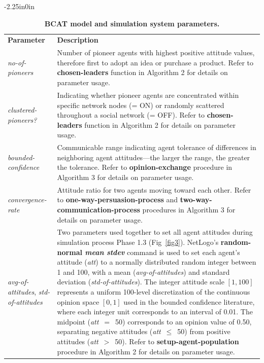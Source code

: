 \documentclass[10pt,letterpaper]{article}
\newlength\savedwidth
\newcommand\thickhline{\noalign{\global\savedwidth\arrayrulewidth\global\arrayrulewidth 2pt}%
\hline
\noalign{\global\arrayrulewidth\savedwidth}}
\begin{document}
\begin{table}[!ht]
\begin{adjustwidth}{-2.25in}{0in}
\centering
\caption{\textbf{BCAT model and simulation system parameters.}}
\label{table2}
\begin{tabularx}{\linewidth}{|l|X|}
\hline
\textbf{Parameter} & \textbf{Description} \\ \thickhline
\textit{no-of-pioneers} & Number of pioneer agents with highest positive attitude values, therefore first to adopt an idea or purchase a product. Refer to \textbf{chosen-leaders} function in Algorithm 2 for details on parameter usage. \\ \hline
\textit{clustered-pioneers?} & Indicating whether pioneer agents are concentrated within specific network nodes (= ON) or randomly scattered throughout a social network (= OFF). Refer to \textbf{chosen-leaders} function in Algorithm 2 for details on parameter usage. \\ \hline
\textit{bounded-confidence} & Communicable range indicating agent tolerance of differences in neighboring agent attitudes---the larger the range, the greater the tolerance. Refer to \textbf{opinion-exchange} procedure in Algorithm 3 for details on parameter usage. \\ \hline
\textit{convergence-rate} & Attitude ratio for two agents moving toward each other. Refer to \textbf{one-way-persuasion-process} and \textbf{two-way-communication-process} procedures in Algorithm 3 for details on parameter usage. \\ \hline
\textit{avg-of-attitudes}, \textit{std-of-attitudes} & Two parameters used together to set all agent attitudes during simulation process Phase 1.3 (Fig~\ref{fig3}). NetLogo's \textbf{random-normal \textit{mean} \textit{stdev}} command is used to set each agent's attitude (\textit{att}) to a normally distributed random integer between 1 and 100, with a mean (\textit{avg-of-attitudes}) and standard deviation (\textit{std-of-attitudes}). The integer attitude scale $[1, 100]$ represents a uniform 100-level discretization of the continuous opinion space $[0, 1]$ used in the bounded confidence literature, where each integer unit corresponds to an interval of 0.01. The midpoint (\textit{att}~$=$~50) corresponds to an opinion value of 0.50, separating negative attitudes (\textit{att}~$\leq$~50) from positive attitudes (\textit{att}~$>$~50). Refer to \textbf{setup-agent-population} procedure in Algorithm 2 for details on parameter usage. \\ \hline

\end{tabularx}
\end{adjustwidth}
\end{table}
\end{document}
